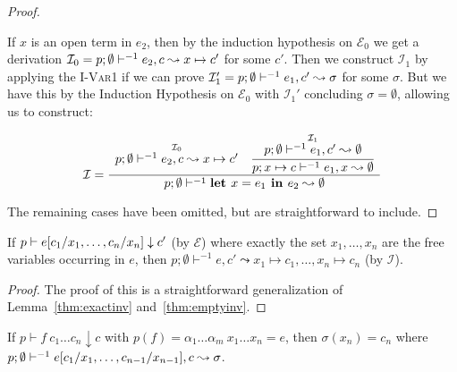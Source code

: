\begin{proof}
\begin{itemize}
      If $x$ is an open term in $e_2$, then by the induction hypothesis on
      $\mathcal{E}_0$ we get a derivation $\mathcal{I}_0 = p;\emptyset\vdash^{-1} e_2, c
      \leadsto x \mapsto c'$ for some $c'$. Then we construct $\mathcal{I}_1$
      by applying the \textsc{I-Var1} if we can prove $\mathcal{I}_1' =
      p;\emptyset\vdash^{-1} e_1, c' \leadsto \sigma$ for some $\sigma$. But we have this by
      the Induction Hypothesis on $\mathcal{E}_0$ with $\mathcal{I}_1'$
      concluding $\sigma = \emptyset$, allowing us to construct:

      \begin{align*}
        \mathcal{I} = \dfrac
          {\begin{array}{cc}
              \overset
                {\mathcal{I}_0}
                {p;\emptyset\vdash^{-1} e_2, c \leadsto x \mapsto c'} &
              \cfrac
                {\overset
                  {\mathcal{I}_1}
                  {p;\emptyset\vdash^{-1} e_1, c' \leadsto \emptyset}
                }
                {p; x \mapsto c \vdash^{-1} e_1, x \leadsto \emptyset}
           \end{array}}
          {p;\emptyset\vdash^{-1} \textbf{let } x = e_1 \textbf{ in } e_2 \leadsto \emptyset}
      \end{align*}

  \end{itemize}

  The remaining cases have been omitted, but are straightforward to include.

\end{proof}

\begin{lemma}\label{thm:generalinv}

  If $p \vdash e[c_1 / x_1, \dots, c_n / x_n] \downarrow c'$ (by $\mathcal{E}$)
  where exactly the set $x_1, \dots, x_n$ are the free variables occurring in
  $e$, then $p; \emptyset \vdash^{-1} e, c' \leadsto x_1 \mapsto c_1, \dots,
  x_n \mapsto c_n$ (by $\mathcal{I}$).

\end{lemma}

\begin{proof}

  The proof of this is a straightforward generalization of
  Lemma~\ref{thm:exactinv} and~\ref{thm:emptyinv}.

\end{proof}

\begin{theorem}\label{thm:inversemain}

  If $p \vdash f~c_1 \dots c_n \downarrow c$ with $p(f) = \alpha_1 \dots
  \alpha_m~x_1 \dots x_n = e$, then $\sigma(x_n) = c_n$ where $p;\emptyset\vdash^{-1} e[c_1
  / x_1, \dots, c_{n-1} / x_{n-1}], c \leadsto \sigma$.

\end{theorem}

